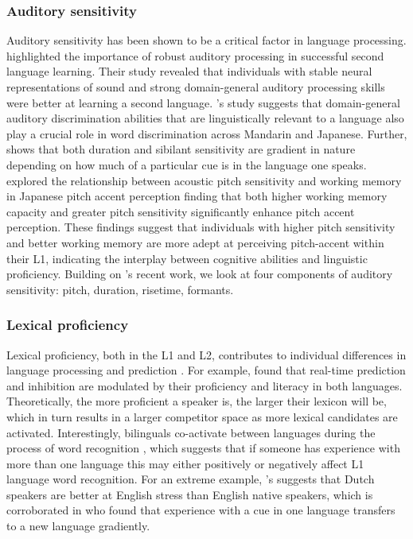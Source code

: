 \subsubsection{Auditory sensitivity}
Auditory sensitivity has been shown to be a critical factor in language processing. \cite{Kachlicka_Saito_Tierney_2019} highlighted the importance of robust auditory processing in successful second language learning. Their study revealed that individuals with stable neural representations of sound and strong domain-general auditory processing skills were better at learning a second language. \cite{bramlett_wiener_24_speechprosody}'s study suggests that domain-general auditory discrimination abilities that are linguistically relevant to a language also play a crucial role in word discrimination across Mandarin and Japanese. Further, \cite{Pajak_2014} shows that both duration and sibilant sensitivity are gradient in nature depending on how much of a particular cue is in the language one speaks. \cite{goss_2014} explored the relationship between acoustic pitch sensitivity and working memory in Japanese pitch accent perception finding that both higher working memory capacity and greater pitch sensitivity significantly enhance pitch accent perception. These findings suggest that individuals with higher pitch sensitivity and better working memory are more adept at perceiving pitch-accent within their L1, indicating the interplay between cognitive abilities and linguistic proficiency.
Building on \cite{Kachlicka_Saito_Tierney_2019}'s recent work, we look at four components of auditory sensitivity: pitch, duration, risetime, formants.  

\subsubsection{Lexical proficiency}
Lexical proficiency, both in the L1 and L2, contributes to individual differences in language processing and prediction \citep{Diependaele2013,Yap2012}. For example, \citep{Kukona2016} found that real-time prediction and inhibition are modulated by their proficiency and literacy in both languages. Theoretically, the more proficient a speaker is, the larger their lexicon will be, which in turn results in a larger competitor space as more lexical candidates are activated. Interestingly, bilinguals co-activate between languages during the process of word recognition \citep{kroll1997lexical,dijkstra2002architecture,marian2003competing}, which suggests that if someone has experience with more than one language this may either positively or negatively affect L1 language word recognition. For an extreme example, \cite{cutler2007dutch}'s suggests that Dutch speakers are better at English stress than English native speakers, which is corroborated in \cite{Pajak_2014} who found that experience with a cue in one language transfers to a new language gradiently. 

